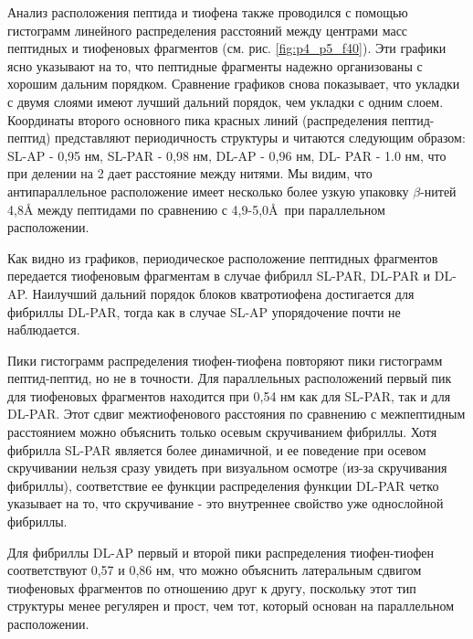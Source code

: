     Анализ расположения пептида и тиофена также проводился с помощью гистограмм линейного распределения расстояний между центрами масс пептидных и тиофеновых фрагментов (см. рис. \ref{fig:p4_p5_f40}). Эти графики ясно указывают на то, что пептидные фрагменты надежно организованы с хорошим дальним порядком. Сравнение графиков снова показывает, что укладки с двумя слоями имеют лучший дальний порядок, чем укладки с одним слоем. Координаты второго основного пика красных линий (распределения пептид-пептид) представляют периодичность структуры и читаются следующим образом: SL-AP - 0,95 нм, SL-PAR - 0,98 нм, DL-AP - 0,96 нм, DL- PAR - 1.0 нм, что при делении на 2 дает расстояние между нитями. Мы видим, что антипараллельное расположение имеет несколько более узкую упаковку $\beta$-нитей 4,8\AA{}  между пептидами по сравнению с 4,9-5,0\AA\  при параллельном расположении.

    Как видно из графиков, периодическое расположение пептидных фрагментов передается тиофеновым фрагментам в случае фибрилл SL-PAR, DL-PAR и DL-AP. Наилучший дальний порядок блоков кватротиофена достигается для фибриллы DL-PAR, тогда как в случае SL-AP упорядочение почти не наблюдается.

    Пики гистограмм распределения тиофен-тиофена повторяют пики гистограмм пептид-пептид, но не в точности. Для параллельных расположений первый пик для тиофеновых фрагментов находится при 0,54 нм как для SL-PAR, так и для DL-PAR. Этот сдвиг межтиофенового расстояния по сравнению с межпептидным расстоянием можно объяснить только осевым скручиванием фибриллы. Хотя фибрилла SL-PAR является более динамичной, и ее поведение при осевом скручивании нельзя сразу увидеть при визуальном осмотре (из-за скручивания фибриллы), соответствие ее функции распределения функции DL-PAR четко указывает на то, что скручивание  - это внутреннее свойство уже однослойной фибриллы.

    Для фибриллы DL-AP первый и второй пики распределения тиофен-тиофен соответствуют 0,57 и 0,86 нм, что можно объяснить латеральным сдвигом тиофеновых фрагментов по отношению друг к другу, поскольку этот тип структуры менее регулярен и прост, чем тот, который основан на параллельном расположении.



